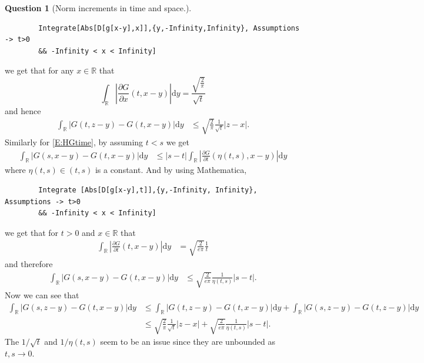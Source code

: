 \documentclass[a4paper,11pt]{article}
\numberwithin{equation}{section}
\theoremstyle{plain}
\theoremstyle{definition}
\newtheorem{question}{Question}
\newcommand{\ud}{\ensuremath{\mathrm{d} }}
\newcommand{\R}{\mathbb{R}}
\begin{document}
\begin{question}[Norm increments in time and space.]
\begin{verbatim}
		Integrate[Abs[D[g[x-y],x]],{y,-Infinity,Infinity}, Assumptions -> t>0 
		&& -Infinity < x < Infinity]
	\end{verbatim}
	we get that for any $x\in \R$ that 
	\[
		\int_{\R}\left|\frac{\partial G}{\partial x}(t,x-y)\right|\ud y = \frac{\sqrt{\frac{2}{\pi}}}{\sqrt{t}}
	\]
	and hence 
	\begin{align*}
		\int_{\R}|G(t,z-y) - G(t,x-y)| \ud y & \le \sqrt{\frac{2}{\pi}} \frac{1}{\sqrt{t}}|z - x|.
	\end{align*}
	Similarly for \eqref{E:HGtime}, by assuming $t<s$ we get 
	\begin{align*}
	\int_{\R}|G(s,x-y) - G(t,x-y)| \ud y & \le  |s - t| 	\int_{\R}\left|\frac{\partial G}{\partial t}(\eta(t,s), x -y)\right|\ud y 
	\end{align*}
	where $\eta(t,s) \in (t, s)$ is a constant. And by using Mathematica, 
	\begin{verbatim}
		Integrate [Abs[D[g[x-y],t]],{y,-Infinity, Infinity}, Assumptions -> t>0 
		&& -Infinity < x < Infinity]
	\end{verbatim}
	we get that for $t>0$ and $x \in \R$ that 
	\begin{align*}
		\int_{\R}\left|\frac{\partial G}{\partial t}(t, x -y)\right|\ud y  & = \sqrt{\frac{2}{e \pi}} \frac{1}{t}
	\end{align*}
	and therefore 
	\begin{align*}
	\int_{\R}|G(s,x-y) - G(t,x-y)| \ud y & \le \sqrt{\frac{2}{e \pi}} \frac{1}{\eta(t,s)}  |s - t| .
	\end{align*}
	Now we can see that 
	\begin{align*}
	\int_{\R}|G(s,z-y) - G(t,x-y)| \ud y &\le  \int_{\R}|G(t,z-y) - G(t,x-y)| \ud y +  \int_{\R}|G(s,z-y) - G(t,z-y)| \ud y  \\
	& \le \sqrt{\frac{2}{\pi}} \frac{1}{\sqrt{t}}|z - x| + \sqrt{\frac{2}{e \pi}} \frac{1}{\eta(t,s)}  |s - t|.
	\end{align*}
	The $1/\sqrt{t}$ and $1/\eta(t,s)$ seem to be an issue since they are unbounded as $t, s \to 0$. 
	

\end{question}
\end{document}
